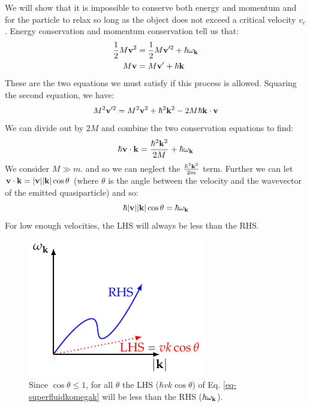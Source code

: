 We will show that it is impossible to conserve both energy and momentum and for the particle to relax so long as the object does not exceed a critical velocity $v_c$. Energy conservation and momentum conservation tell us that:
\begin{equation}
    \begin{split}
        \frac{1}{2}M\mathbf{v}^2 &= \frac{1}{2}M\mathbf{v}'^2 + \hbar \omega_{\mathbf{k}}
        \\ M\mathbf{v} &= M\mathbf{v}' + \hbar\mathbf{k}
    \end{split}
\end{equation}
These are the two equations we must satisfy if this process is allowed.
Squaring the second equation, we have:
\begin{align*}
    M^2\mathbf{v}'^2 = M^2\mathbf{v}^2 + \hbar^2\mathbf{k}^2 - 2M\hbar \mathbf{k} \cdot \mathbf{v}
\end{align*}
We can divide out by $2M$ and combine the two conservation equations to find:
\begin{equation}
    \hbar \mathbf{v} \cdot \mathbf{k} = \frac{\hbar^2\mathbf{k}^2}{2M} + \hbar \omega_{\mathbf{k}}
\end{equation}
We consider $M \gg m$. and so we can neglect the $ \frac{\hbar^2\mathbf{k}^2}{2m}$ term. Further we can let $\mathbf{v} \cdot \mathbf{k} = \lvert \mathbf{v} \rvert\lvert \mathbf{k} \rvert\cos\theta$ (where $\theta$ is the angle between the velocity and the wavevector of the emitted quasiparticle) and so:
\begin{equation}\label{eq-superfluidkomegak}
    \hbar \lvert \mathbf{v} \rvert\lvert \mathbf{k} \rvert\cos\theta = \hbar \omega_{\mathbf{k}}
\end{equation}
For low enough velocities, the LHS will always be less than the RHS.

\begin{figure}[htbp]
    \centering
    \includegraphics[]{Images/fig-graphicalsuperfluidsoln.pdf}

    \caption{Since $\cos\theta \leq 1$, for all $\theta$ the LHS ($\hbar vk\cos\theta$) of Eq. \eqref{eq-superfluidkomegak} will be less than the RHS ($\hbar \omega_{\mathbf{k}}$).}
    \label{fig-graphicalsuperfluidsoln}
\end{figure}


